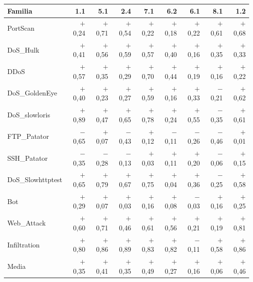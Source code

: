 \begin{tabular}{@{}lrrrrrrrr@{}}
\toprule
Familia & 1.1 & 5.1 & 2.4 & 7.1 & 6.2 & 6.1 & 8.1 & 1.2 \\
\midrule
PortScan & $+$0{,}24 & $+$0{,}71 & $+$0{,}54 & $+$0{,}22 & $+$0{,}18 & $+$0{,}22 & $+$0{,}61 & $+$0{,}68 \\
DoS\_Hulk & $+$0{,}41 & $+$0{,}56 & $+$0{,}59 & $+$0{,}57 & $+$0{,}40 & $+$0{,}16 & $+$0{,}35 & $+$0{,}33 \\
DDoS & $+$0{,}57 & $+$0{,}35 & $+$0{,}29 & $+$0{,}70 & $+$0{,}44 & $+$0{,}19 & $+$0{,}16 & $+$0{,}22 \\
DoS\_GoldenEye & $+$0{,}40 & $+$0{,}23 & $+$0{,}27 & $+$0{,}59 & $+$0{,}16 & $+$0{,}33 & $-$0{,}21 & $+$0{,}62 \\
DoS\_slowloris & $+$0{,}89 & $+$0{,}47 & $+$0{,}65 & $+$0{,}78 & $+$0{,}24 & $+$0{,}55 & $-$0{,}35 & $+$0{,}61 \\
FTP\_Patator & $-$0{,}65 & $+$0{,}07 & $-$0{,}43 & $+$0{,}12 & $-$0{,}11 & $-$0{,}26 & $-$0{,}46 & $+$0{,}01 \\
SSH\_Patator & $-$0{,}35 & $-$0{,}28 & $-$0{,}13 & $+$0{,}03 & $+$0{,}11 & $+$0{,}20 & $-$0{,}06 & $+$0{,}15 \\
DoS\_Slowhttptest & $+$0{,}65 & $+$0{,}79 & $+$0{,}67 & $+$0{,}75 & $+$0{,}04 & $+$0{,}36 & $-$0{,}25 & $+$0{,}58 \\
Bot & $+$0{,}29 & $+$0{,}07 & $+$0{,}03 & $+$0{,}16 & $+$0{,}08 & $-$0{,}03 & $+$0{,}16 & $+$0{,}25 \\
Web\_Attack & $+$0{,}60 & $+$0{,}71 & $+$0{,}46 & $+$0{,}61 & $+$0{,}56 & $+$0{,}21 & $+$0{,}19 & $+$0{,}81 \\
Infiltration & $+$0{,}80 & $+$0{,}86 & $+$0{,}89 & $+$0{,}83 & $+$0{,}82 & $-$0{,}11 & $+$0{,}58 & $+$0{,}86 \\
\midrule
Media & $+$0{,}35 & $+$0{,}41 & $+$0{,}35 & $+$0{,}49 & $+$0{,}27 & $+$0{,}16 & $+$0{,}06 & $+$0{,}46 \\
\bottomrule
\end{tabular}
